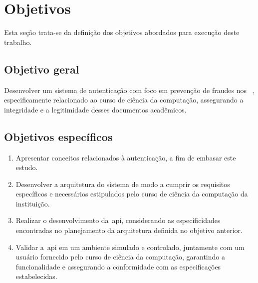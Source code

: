 \section{Objetivos}\label{sec:objetivos}

Esta seção trata-se da definição dos objetivos abordados para
execução deste trabalho.
\subsection{Objetivo geral}\label{subsec:objetivo-geral}

Desenvolver um sistema de autenticação com foco em prevenção de fraudes nos
~, especificamente relacionado ao curso de ciência da computação,
assegurando a integridade e a legitimidade desses documentos acadêmicos.
\subsection{Objetivos específicos}\label{subsec:objetivos-especificos}

\newcommand{\buscaReferencia}{
    Apresentar conceitos relacionados à autenticação, a fim de embasar este
    estudo.
}

\newcommand{\arquitetura}{
    Desenvolver a arquitetura do sistema de modo a cumprir os requisitos
    específicos e necessários estipulados pelo curso de ciência da computação da instituição.
}

\newcommand{\implementacao}{
    Realizar o desenvolvimento da~\acrshort{api}, considerando as
    especificidades
    encontradas no planejamento da arquitetura definida no objetivo anterior.
}

\newcommand{\testes}{
    Validar a~\acrshort{api} em um ambiente simulado e controlado, juntamente
    com um usuário fornecido pelo curso de ciência da computação, garantindo
    a funcionalidade e assegurando a conformidade com as especificações
    estabelecidas.
}

\begin{enumerate}[label=\alph*)]
    \item  \buscaReferencia
    \item  \arquitetura
    \item  \implementacao
    \item  \testes
\end{enumerate}